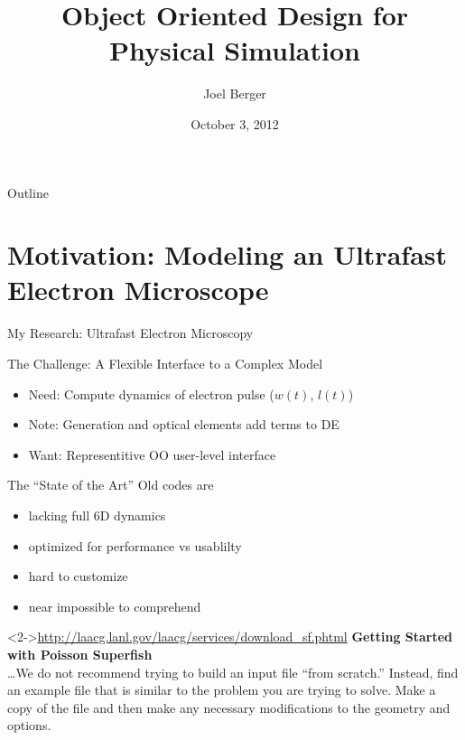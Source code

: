 \documentclass[mathserif]{beamer}
\title[OO Design]{Object Oriented Design for Physical Simulation}
\author{Joel Berger}
\institute[UIC]{University of Illinois at Chicago}
\date{October 3, 2012}
\begin{document}
\begin{frame}
  \maketitle
\end{frame}

\begin{frame}{Outline}
  \tableofcontents
\end{frame}


\section{Motivation: Modeling an Ultrafast Electron Microscope}

\begin{frame}{My Research: Ultrafast Electron Microscopy}
  
\end{frame}

\begin{frame}{The Challenge: A Flexible Interface to a Complex Model}
  
  \begin{itemize}
    \item<2-> Need: Compute dynamics of electron pulse ($w(t)$, $l(t)$)
    \item<3-> Note: Generation and optical elements add terms to DE
    \item<4-> Want: Representitive OO user-level interface
  \end{itemize}
\end{frame}

\begin{frame}{The ``State of the Art''}
  Old codes are
  \begin{itemize}
    \item lacking full 6D dynamics
    \item optimized for performance vs usablilty
    \item hard to customize
    \item near impossible to comprehend
  \end{itemize}
  \begin{block}<2->{\url{http://laacg.lanl.gov/laacg/services/download_sf.phtml}}
    \textbf{Getting Started with Poisson Superfish}\\
    \ldots We do not recommend trying to build an input file ``from scratch.'' Instead, find an example file that is similar to the problem you are trying to solve. Make a copy of the file and then make any necessary modifications to the geometry and options.
  \end{block}
\end{frame}
\end{document}
